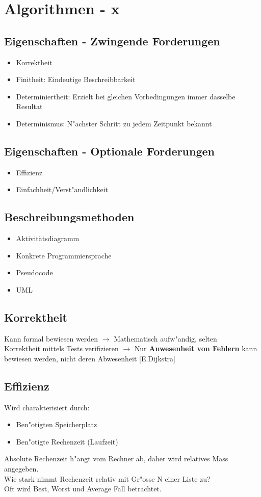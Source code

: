\section{Algorithmen - x}
\subsection{Eigenschaften - Zwingende Forderungen}
\begin{itemize}
	\item Korrektheit
	\item Finitheit: Eindeutige Beschreibbarkeit
	\item Determiniertheit: Erzielt bei gleichen Vorbedingungen immer dasselbe Resultat
	\item Determinismus: N"achster Schritt zu jedem Zeitpunkt bekannt
\end{itemize}

\subsection{Eigenschaften - Optionale Forderungen}
\begin{itemize}
	\item Effizienz 
	\item Einfachheit/Verst"andlichkeit
\end{itemize}

\subsection{Beschreibungsmethoden}
\begin{itemize}
	\item Aktivitätsdiagramm
	\item Konkrete Programmiersprache
	\item Pseudocode
	\item UML
\end{itemize}


\subsection{Korrektheit}
Kann formal bewiesen werden $\rightarrow$ Mathematisch aufw"andig, selten\\
Korrektheit mittels Tests verifizieren $\rightarrow$ Nur \textbf{Anwesenheit von Fehlern} kann bewiesen werden, nicht deren Abwesenheit [E.Dijkstra]

\subsection{Effizienz}
Wird charakterisiert durch: 
\begin{itemize}
\item Ben"otigten Speicherplatz
\item Ben"otigte Rechenzeit (Laufzeit)
\end{itemize}
Absolute Rechenzeit h"angt vom Rechner ab, daher wird relatives Mass angegeben. \\
Wie stark nimmt Rechenzeit relativ mit Gr"osse N einer Liste zu? \\
Oft wird Best, Worst und Average Fall betrachtet.


